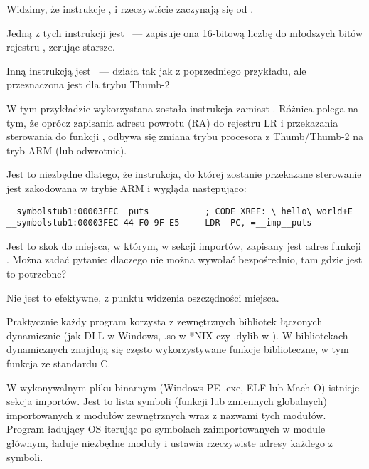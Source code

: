 Widzimy, że instrukcje ,  i  rzeczywiście zaczynają się od .

Jedną z tych instrukcji jest
~--- zapisuje ona 16-bitową liczbę do młodszych bitów rejestru , zerując starsze.

Inną instrukcją jest ~---  działa tak jak  z poprzedniego przykładu, ale przeznaczona jest dla trybu Thumb-2

W tym przykładzie wykorzystana została instrukcja  zamiast .
Różnica polega na tym, że oprócz zapisania adresu powrotu (\ac{RA}) do rejestru \ac{LR} i przekazania sterowania
do funkcji \puts, odbywa się zmiana trybu procesora z Thumb/Thumb-2 na tryb ARM (lub odwrotnie).

Jest to niezbędne dlatego, że instrukcja, do której zostanie przekazane sterowanie jest zakodowana w trybie ARM i wygląda następująco:

\begin{lstlisting}[style=customasmARM]
__symbolstub1:00003FEC _puts           ; CODE XREF: \_hello\_world+E
__symbolstub1:00003FEC 44 F0 9F E5     LDR  PC, =__imp__puts
\end{lstlisting}

Jest to skok do miejsca, w którym, w sekcji importów, zapisany jest adres funkcji \puts.
Można zadać pytanie: dlaczego nie można wywołać \puts bezpośrednio, tam gdzie jest to potrzebne?

Nie jest to efektywne, z punktu widzenia oszczędności miejsca.

Praktycznie każdy program korzysta z zewnętrznych bibliotek łączonych dynamicznie (jak DLL w Windows, .so w *NIX
czy .dylib w \MacOSX).
W bibliotekach dynamicznych znajdują się często wykorzystywane funkcje biblioteczne, w tym funkcja \puts ze standardu C.

W wykonywalnym pliku binarnym (Windows PE .exe, ELF lub Mach-O) istnieje sekcja importów.
Jest to lista symboli (funkcji lub zmiennych globalnych) importowanych z modułów zewnętrznych wraz z nazwami tych modułów.
Program ładujący \ac{OS} iterując po symbolach zaimportowanych w module głównym, ładuje niezbędne moduły i ustawia rzeczywiste adresy każdego z symboli.

